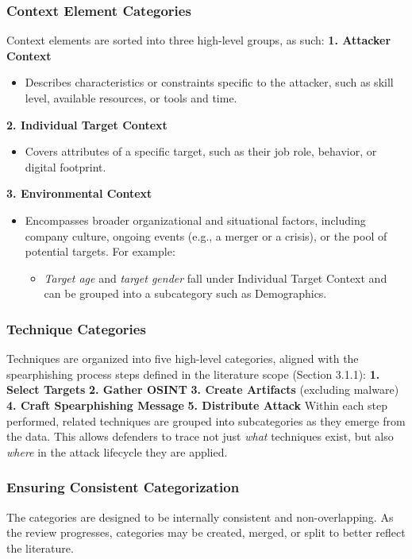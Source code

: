 \subsubsection{Context Element Categories}
Context elements are sorted into three high-level groups, as such:
\textbf{1. Attacker Context}
\begin{itemize}
\item Describes characteristics or constraints specific to the attacker, such as skill level, available resources, or tools and time.
\end{itemize}
\textbf{2. Individual Target Context}
\begin{itemize}
    \item Covers attributes of a specific target, such as their job role, behavior, or digital footprint.
\end{itemize}
\textbf{3. Environmental Context}
\begin{itemize}
    \item Encompasses broader organizational and situational factors, including company culture, ongoing events (e.g., a merger or a crisis), or the pool of potential targets. For example:
    \begin{itemize}
        \item \textit{Target age} and \textit{target gender} fall under Individual Target Context and can be grouped into a subcategory such as Demographics.
    \end{itemize}
\end{itemize}

\subsubsection{Technique Categories}
Techniques are organized into five high-level categories, aligned with the spearphishing process steps defined in the literature scope (Section 3.1.1):
\textbf{1. Select Targets}
\textbf{2. Gather OSINT}
\textbf{3. Create Artifacts} (excluding malware)
\textbf{4. Craft Spearphishing Message}
\textbf{5. Distribute Attack}
Within each step performed, related techniques are grouped into subcategories as they emerge from the data. This allows defenders to trace not just \textit{what} techniques exist, but also \textit{where} in the attack lifecycle they are applied.

\subsubsection{Ensuring Consistent Categorization}
The categories are designed to be internally consistent and non-overlapping. As the review progresses, categories may be created, merged, or split to better reflect the literature.

